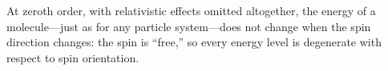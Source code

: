 At zeroth order, with relativistic effects omitted altogether, the energy of a molecule---just as for any particle system---does not change when the spin direction changes: the spin is ``free,'' so every energy level is degenerate with respect to spin orientation.
